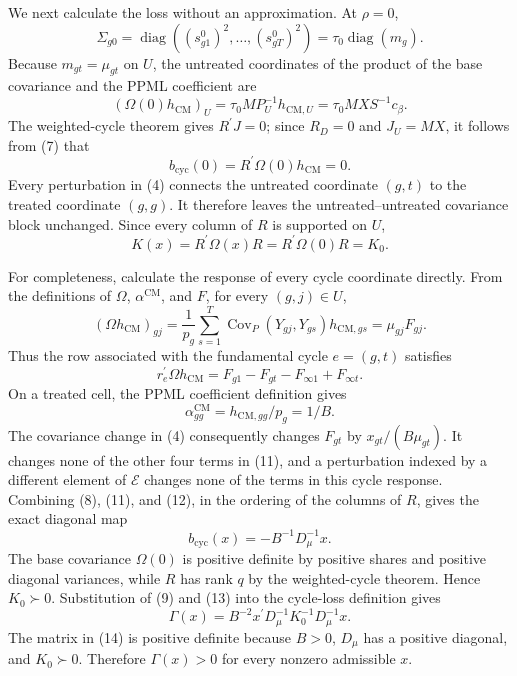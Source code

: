 We next calculate the loss without an approximation.  At \(\rho=0\),
\[
\Sigma_{g0}=\operatorname{diag}((s^0_{g1})^2,\ldots,(s^0_{gT})^2)
=\tau_0\operatorname{diag}(m_g).
\]
Because \(m_{gt}=\mu_{gt}\) on \(U\), the untreated coordinates of the product of the base covariance and the PPML coefficient are
\[
(\Omega(0)h_{\mathrm{CM}})_U
=\tau_0M P_U^{-1}h_{\mathrm{CM},U}
=\tau_0MX S^{-1}c_\beta.                              \tag{7}
\]
The weighted-cycle theorem gives \(R^{\prime}J=0\); since \(R_D=0\) and \(J_U=MX\), it follows from (7) that
\[
b_{\mathrm{cyc}}(0)=R^{\prime}\Omega(0)h_{\mathrm{CM}}=0. \tag{8}
\]
Every perturbation in (4) connects the untreated coordinate \((g,t)\) to the treated coordinate \((g,g)\).  It therefore leaves the untreated--untreated covariance block unchanged.  Since every column of \(R\) is supported on \(U\),
\[
K(x)=R^{\prime}\Omega(x)R
=R^{\prime}\Omega(0)R=K_0.                            \tag{9}
\]

For completeness, calculate the response of every cycle coordinate directly.  From the definitions of \(\Omega\), \(\alpha^{\mathrm{CM}}\), and \(F\), for every \((g,j)\in U\),
\[
(\Omega h_{\mathrm{CM}})_{gj}
=\frac1{p_g}\sum_{s=1}^T
\operatorname{Cov}_P(Y_{gj},Y_{gs})h_{\mathrm{CM},gs}
=\mu_{gj}F_{gj}.                                      \tag{10}
\]
Thus the row associated with the fundamental cycle \(e=(g,t)\) satisfies
\[
r_e^{\prime}\Omega h_{\mathrm{CM}}
=F_{g1}-F_{gt}-F_{\infty1}+F_{\infty t}.              \tag{11}
\]
On a treated cell, the PPML coefficient definition gives
\[
\alpha^{\mathrm{CM}}_{gg}
=h_{\mathrm{CM},gg}/p_g=1/B.                          \tag{12}
\]
The covariance change in (4) consequently changes \(F_{gt}\) by
\(x_{gt}/(B\mu_{gt})\).  It changes none of the other four terms in (11), and a perturbation indexed by a different element of \(\mathcal E\) changes none of the terms in this cycle response.  Combining (8), (11), and (12), in the ordering of the columns of \(R\), gives the exact diagonal map
\[
b_{\mathrm{cyc}}(x)
=-B^{-1}D_\mu^{-1}x.                                  \tag{13}
\]
The base covariance \(\Omega(0)\) is positive definite by positive shares and positive diagonal variances, while \(R\) has rank \(q\) by the weighted-cycle theorem.  Hence \(K_0\succ0\).  Substitution of (9) and (13) into the cycle-loss definition gives
\[
\Gamma(x)
=B^{-2}x^{\prime}D_\mu^{-1}K_0^{-1}D_\mu^{-1}x.       \tag{14}
\]
The matrix in (14) is positive definite because \(B>0\), \(D_\mu\) has a positive diagonal, and \(K_0\succ0\).  Therefore \(\Gamma(x)>0\) for every nonzero admissible \(x\).

